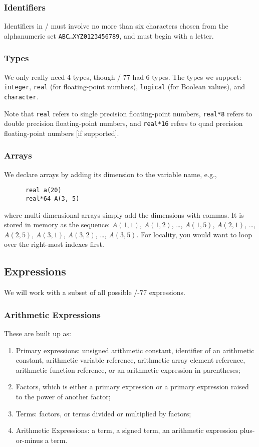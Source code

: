 \subsubsection{Identifiers}
Identifiers in \FORTRAN/ must involve no more than six characters chosen
from the alphanumeric set \texttt{ABC\dots XYZ0123456789}, and must
begin with a letter.

\subsubsection{Types}
We only really need 4 types, though \FORTRAN/-77 had 6 types. The types
we support: \texttt{integer}, \texttt{real} (for floating-point
numbers), \texttt{logical} (for Boolean values), and \texttt{character}.

Note that \texttt{real} refers to single precision floating-point
numbers, \texttt{real*8} refers to double precision floating-point
numbers, and \texttt{real*16} refers to quad precision floating-point
numbers [if supported].

\subsubsection{Arrays}
We declare arrays by adding its dimension to the variable name, e.g.,
\begin{lstlisting}
      real a(20)
      real*64 A(3, 5)
\end{lstlisting}
where multi-dimensional arrays simply add the dimensions with commas. It
is stored in memory as the sequence: $A(1,1)$, $A(1,2)$, \dots,
$A(1,5)$, $A(2,1)$, \dots, $A(2,5)$, $A(3,1)$, $A(3,2)$, \dots, $A(3,5)$.
For locality, you would want to loop over the right-most indexes first.

\subsection{Expressions}
We will work with a subset of all possible \FORTRAN/-77 expressions.

\subsubsection{Arithmetic Expressions}
These are built up as:
\begin{enumerate}
\item Primary expressions: unsigned arithmetic constant, identifier of
  an arithmetic constant, arithmetic variable reference, arithmetic
  array element reference, arithmetic function reference, or an
  arithmetic expression in parentheses;
\item Factors, which is either a primary expression or a primary
  expression raised to the power of another factor;
\item Terms: factors, or terms divided or multiplied by factors; 
\item Arithmetic Expressions: a term, a signed term, an arithmetic
  expression plus-or-minus a term.
\end{enumerate}

